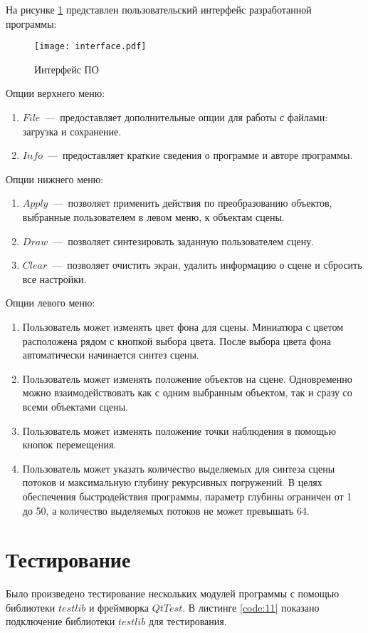 На рисунке \ref{img:interface} представлен пользовательский интерфейс разработанной программы:

\begin{figure}[h!]
    \centering
    \texttt{[image: interface.pdf]}
    \caption{Интерфейс ПО}
    \label{img:interface}
\end{figure}

Опции верхнего меню:
\begin{enumerate}[label={\arabic*)}]
	\item $File$~---~предоставляет дополнительные опции для работы с файлами: загрузка и сохранение.
	\item $Info$~---~предоставляет краткие сведения о программе и авторе программы.
\end{enumerate}

Опции нижнего меню:
\begin{enumerate}[label={\arabic*)}]
	\item $Apply$~---~позволяет применить действия по преобразованию объектов, выбранные пользователем в левом меню, к объектам сцены.
	\item $Draw$~---~позволяет синтезировать заданную пользователем сцену.
	\item $Clear$~---~позволяет очистить экран, удалить информацию о сцене и сбросить все настройки.
\end{enumerate}

Опции левого меню:
\begin{enumerate}[label={\arabic*)}]
	\item Пользователь может изменять цвет фона для сцены. Миниатюра с цветом расположена рядом с кнопкой выбора цвета. После выбора цвета фона автоматически начинается синтез сцены.
	\item Пользователь может изменять положение объектов на сцене. Одновременно можно взаимодействовать как с одним выбранным объектом, так и сразу со всеми объектами сцены.
	\item Пользователь может изменять положение точки наблюдения в помощью кнопок перемещения.
	\item Пользователь может указать количество выделяемых для синтеза сцены потоков и максимальную глубину рекурсивных погружений. В целях обеспечения быстродействия программы, параметр глубины ограничен от 1 до 50, а количество выделяемых потоков не может превышать 64.
\end{enumerate}

\section{Тестирование}
Было произведено тестирование нескольких модулей программы с помощью библиотеки $testlib$ и фреймворка $Qt Test$. В листинге \ref{code:11} показано подключение библиотеки $testlib$ для тестирования.

